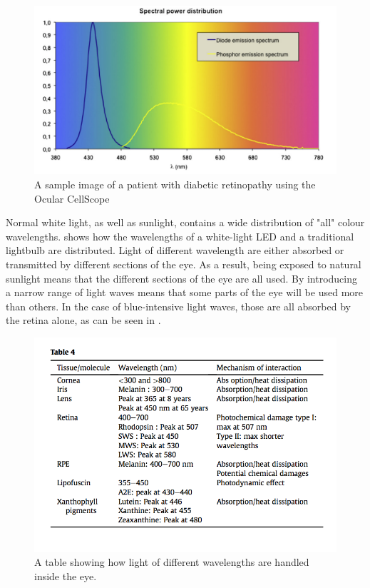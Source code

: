 \begin{figure}[htbp]
\centering
 \includegraphics{figures/bluehazard}
\caption{A sample image of a patient with diabetic retinopathy using the Ocular CellScope}
\label{fig:bluehaz}
\end{figure}

Normal white light, as well as sunlight, contains a wide distribution of "all" colour
wavelengths.  shows how the wavelengths of a white-light LED and a
traditional lightbulb are distributed. Light of different wavelength are either absorbed
or transmitted by different sections of the eye. As a result, being exposed to natural
sunlight means that the different sections of the eye are all used. By introducing a
narrow range of light waves means that some parts of the eye will be used more than
others. In the case of blue-intensive light waves, those are all absorbed by the retina
alone, as can be seen in . 

\begin{figure}[htbp]
\centering
 \includegraphics{figures/wavelength}
\caption{A table showing how light of different wavelengths are handled inside the eye.}
\label{fig:wl}
\end{figure}

